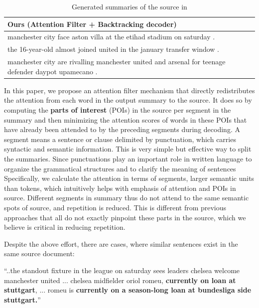 \begin{table}[th!]
\begin{center}
\begin{tabular}{|l|}
\hline \bf Ours (Attention Filter + Backtracking decoder) \\
\hline manchester city face aston villa at the etihad stadium on saturday . \\
       the 16-year-old almost joined united in the january transfer window . \\
	   manchester city are rivalling manchester united and arsenal for teenage defender daypot upamecano .\\
\hline
\end{tabular}
\end{center}
\caption{\label{tab:strong_methods} Generated summaries of the source in }
\end{table}

In this paper, we propose an attention filter mechanism that directly 
redistributes the attention from each word in the output summary to the source. 
It does so by computing the \textbf{parts of interest} (POIs) in the source
per segment in the summary
and then minimizing the attention scores of
words in these POIs that have already been attended to by the preceding 
segments during decoding. 
A segment means a sentence or clause delimited by punctuation,
which carries syntactic and semantic information. 
This is very simple but effective way to split the summaries. 
Since punctuations 
play an important role in written language to organize 
the grammatical structures and to clarify the meaning of sentences~\cite{briscoe1996,Kim19,LiWE19}
Specifically, we calculate the attention in terms of segments, larger semantic units than tokens, 
which intuitively helps with emphasis of attention and POIs in source.
Different segments in summary thus do not attend to the same semantic spots
of source, and repetition is reduced. 
This is different from previous approaches
that all do not exactly pinpoint these parts in the source,
which we believe is critical in reducing repetition. 

Despite the above effort, there are cases, where similar sentences 
exist in the same source document:
\begin{example}
\label{ex:repeatsrc}
\small{``..the standout fixture in the league on saturday sees leaders 
	   chelsea welcome manchester united ... chelsea midfielder oriol romeu, 
\textbf{currently on loan at stuttgart}, ... romeu is 
\textbf{currently on a season-long loan at bundesliga side stuttgart.}''} 
\end{example}

